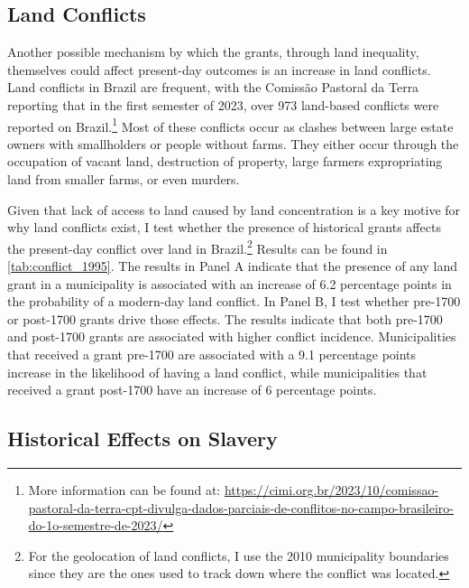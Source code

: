 \documentclass[11pt]{article}
\newcommand{\red}[1]{\textcolor{red}{#1}}
\begin{document}
\subsection{Land Conflicts}

Another possible mechanism by which the grants, through land inequality, themselves could affect present-day outcomes is an increase in land conflicts. 
Land conflicts in Brazil are frequent, with the Comissão Pastoral da Terra reporting that in the first semester of 2023, over 973 land-based conflicts were reported on Brazil.\footnote{More information can be found at: \url{https://cimi.org.br/2023/10/comissao-pastoral-da-terra-cpt-divulga-dados-parciais-de-conflitos-no-campo-brasileiro-do-1o-semestre-de-2023/}}
Most of these conflicts occur as clashes between large estate owners with smallholders or people without farms.
They either occur through the occupation of vacant land, destruction of property, large farmers expropriating land from smaller farms, or even murders. 



Given that lack of access to land caused by land concentration is a key motive for why land conflicts exist, I test whether the presence of historical grants affects the present-day conflict over land in Brazil.\footnote{For the geolocation of land conflicts, I use the 2010 municipality boundaries since they are the ones used to track down where the conflict was located.}
Results can be found in \autoref{tab:conflict_1995}. 
The results in Panel A indicate that the presence of any land grant in a municipality is associated with an increase of 6.2 percentage points in the probability of a modern-day land conflict. 
In Panel B, I test whether pre-1700 or post-1700 grants drive those effects.
The results indicate that both pre-1700 and post-1700 grants are associated with higher conflict incidence. 
Municipalities that received a grant pre-1700 are associated with a 9.1 percentage points increase in the likelihood of having a land conflict, while municipalities that received a grant post-1700 have an increase of 6 percentage points. 

\subsection{Historical Effects on Slavery}
\end{document}
